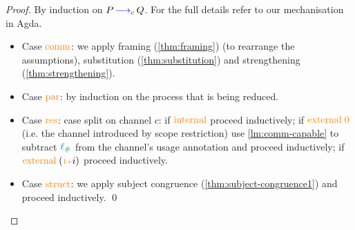 \begin{proof}[Proof]
  By induction on $P \, \textcolor{blue}{\operatorname{\longrightarrow}}_{c} \, Q$. For the full details refer to our mechanisation in Agda.  
  \begin{itemize}
    \item
    Case $\textcolor{orange}{\operatorname{comm}}$: we apply framing (\autoref{thm:framing}) (to rearrange the assumptions), substitution (\autoref{thm:substitution}) and strengthening (\autoref{thm:strengthening}).
  
    \item
    Case $\textcolor{orange}{\operatorname{par}}$: by induction on the process that is being reduced.

    \item
    Case $\textcolor{orange}{\operatorname{res}}$: case split on channel $c$:
    if $\textcolor{orange}{\operatorname{internal}}$ proceed inductively;
    if $\textcolor{orange}{\operatorname{external}}\; \textcolor{orange}{\operatorname{0}}$ (i.e. the channel introduced by scope restriction) use \autoref{lm:comm-capable} to subtract $\textcolor{teal}{\operatorname{\ell_{\#}}}$ from the channel's usage annotation and proceed inductively;
    if $\textcolor{orange}{\operatorname{external}}\; (\textcolor{orange}{\operatorname{\scriptstyle 1+}} i)$ proceed inductively.

    \item
    Case $\textcolor{orange}{\operatorname{struct}}$: we apply subject congruence (\autoref{thm:subject-congruence1}) and proceed inductively. \qed
  \end{itemize}
\end{proof}
